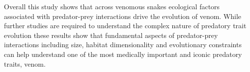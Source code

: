 Overall this study shows that across venomous snakes ecological factors associated with predator-prey interactions drive the evolution of venom. While further studies are required to understand the complex nature of predatory trait evolution these results show that fundamental aspects of predator-prey interactions including size, habitat dimensionality and evolutionary constraints can help understand one of the most medically important and iconic predatory traits, venom.



%
%

